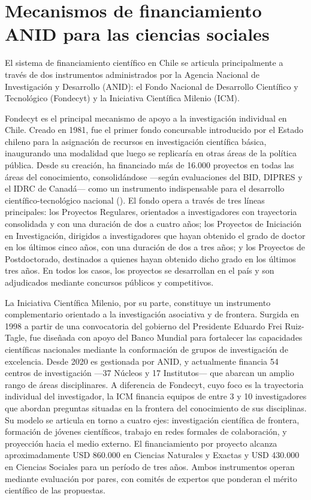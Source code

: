 \documentclass[
  spanish,
  a4paper,
  oneside]{scrbook}
\begin{document}
\section{Mecanismos de financiamiento ANID para las ciencias
sociales}\label{mecanismos-de-financiamiento-anid-para-las-ciencias-sociales}

El sistema de financiamiento científico en Chile se articula
principalmente a través de dos instrumentos administrados por la Agencia
Nacional de Investigación y Desarrollo (ANID): el Fondo Nacional de
Desarrollo Científico y Tecnológico (Fondecyt) y la Iniciativa
Científica Milenio (ICM).

Fondecyt es el principal mecanismo de apoyo a la investigación
individual en Chile. Creado en 1981, fue el primer fondo concursable
introducido por el Estado chileno para la asignación de recursos en
investigación científica básica, inaugurando una modalidad que luego se
replicaría en otras áreas de la política pública. Desde su creación, ha
financiado más de 16.000 proyectos en todas las áreas del conocimiento,
consolidándose ---según evaluaciones del BID, DIPRES y el IDRC de
Canadá--- como un instrumento indispensable para el desarrollo
científico-tecnológico nacional
(). El fondo
opera a través de tres líneas principales: los Proyectos Regulares,
orientados a investigadores con trayectoria consolidada y con una
duración de dos a cuatro años; los Proyectos de Iniciación en
Investigación, dirigidos a investigadores que hayan obtenido el grado de
doctor en los últimos cinco años, con una duración de dos a tres años; y
los Proyectos de Postdoctorado, destinados a quienes hayan obtenido
dicho grado en los últimos tres años. En todos los casos, los proyectos
se desarrollan en el país y son adjudicados mediante concursos públicos
y competitivos.

La Iniciativa Científica Milenio, por su parte, constituye un
instrumento complementario orientado a la investigación asociativa y de
frontera. Surgida en 1998 a partir de una convocatoria del gobierno del
Presidente Eduardo Frei Ruiz-Tagle, fue diseñada con apoyo del Banco
Mundial para fortalecer las capacidades científicas nacionales mediante
la conformación de grupos de investigación de excelencia. Desde 2020 es
gestionada por ANID, y actualmente financia 54 centros de investigación
---37 Núcleos y 17 Institutos--- que abarcan un amplio rango de áreas
disciplinares. A diferencia de Fondecyt, cuyo foco es la trayectoria
individual del investigador, la ICM financia equipos de entre 3 y 10
investigadores que abordan preguntas situadas en la frontera del
conocimiento de sus disciplinas. Su modelo se articula en torno a cuatro
ejes: investigación científica de frontera, formación de jóvenes
científicos, trabajo en redes formales de colaboración, y proyección
hacia el medio externo. El financiamiento por proyecto alcanza
aproximadamente USD 860.000 en Ciencias Naturales y Exactas y USD
430.000 en Ciencias Sociales para un período de tres años. Ambos
instrumentos operan mediante evaluación por pares, con comités de
expertos que ponderan el mérito científico de las propuestas.
\end{document}
